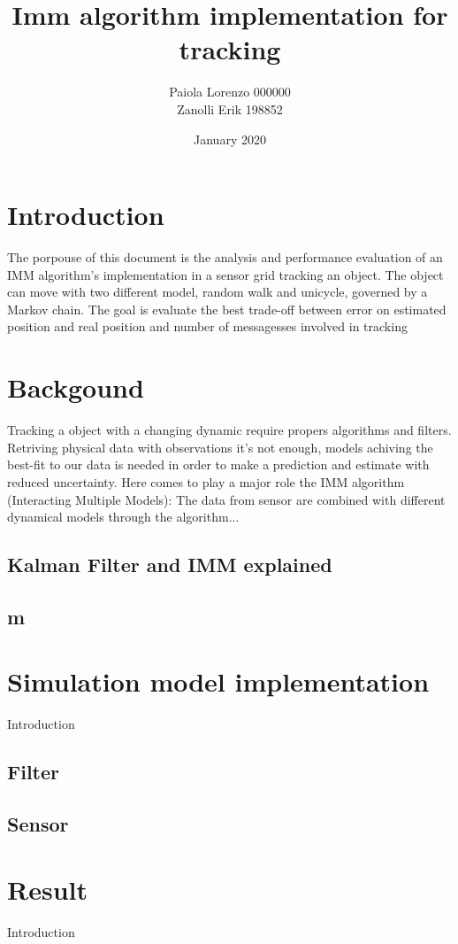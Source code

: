\documentclass{article}
\title{Imm algorithm implementation for tracking}
\author{
Paiola Lorenzo 000000 

Zanolli Erik 198852}
\date{January 2020}
\begin{document}
\maketitle



\section*{Introduction}
\begin{flushleft}
The porpouse of this document is the analysis and performance evaluation of an IMM algorithm's implementation in
a sensor grid tracking an object. The object can move with two different model, random walk and unicycle, governed by
 a Markov chain. The goal is evaluate the best trade-off between error on estimated position and real position and number of 
 messagesses involved in tracking
\end{flushleft}

\begin{multicols}{2}
    \section*{Backgound}
    \begin{flushleft}
        Tracking a object with a changing dynamic require propers algorithms and filters. Retriving physical data with
        observations it's not enough, models achiving the best-fit to our data is needed in order to make a prediction and estimate 
        with reduced uncertainty. Here comes to play a major role the IMM algorithm (Interacting Multiple Models): The data
        from sensor are combined with different dynamical models through the algorithm... 
        \subsection*{Kalman Filter and IMM explained}
        \subsection*{m}
    \end{flushleft}
    \section*{Simulation model implementation}
    Introduction
    \subsection*{Filter}
    \subsection*{Sensor}

    \section*{Result}
    Introduction
    \subsection*{}
\end{multicols}
\end{document}
